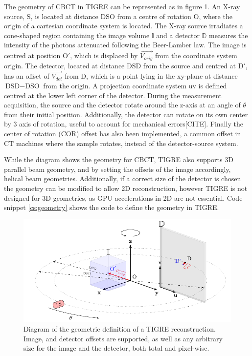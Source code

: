 The geometry of CBCT in TIGRE can be represented as in figure \ref{fig:geometryTIGRE}. An X-ray source, $\text{S}$, is located at distance $\text{DSO}$ from a centre of rotation $\text{O}$, where the origin of a cartesian coordinate system is located. The X-ray source irradiates a cone-shaped region containing the image volume $\mathbb{I}$ and a detector $\mathbb{D}$ measures the intensity of the photons attenuated following the Beer-Lamber law. The image is centred at position $\text{O}'$, which is displaced by $\overrightarrow{V_{orig}}$ from the coordinate system origin. The detector, located at distance $\text{DSD}$ from the source and centred at $\text{D}'$, has an offset of $\overrightarrow{V_{det}}$ from $\text{D}$, which is a point lying in the xy-plane at distance $\text{DSD}-\text{DSO}$ from the origin. A projection coordinate system uv is defined centred at the lower left corner of the detector. During the measurement acquisition, the source and the detector rotate around the z-axis at an angle of $\theta$ from their initial position. Additionally, the detector can rotate on its own center by 3 axis of rotation, useful to account for mechanical errors[CITE]. Finally the center of rotation (COR) offset has also been implemented, a common offset in CT machines where the sample rotates, instead of the detector-source system.

While the diagram shows the geometry for CBCT, TIGRE also supports 3D parallel beam geometry, and by setting the offsets of the image accordingly, helical beam geometries. Additionally, if a correct size of the detector is chosen the geometry can be modified to allow 2D reconstruction, however TIGRE is not designed for 3D geometries, as GPU accelerations in 2D are not essential. Code snippet \ref{cs:geometry} shows the code to define the geometry in TIGRE.

\begin{figure}
\begin{center}

\includegraphics{GPUmethods/geometrytikz-figure0.pdf} 
\end{center}

\caption[Diagram of the geometry of TIGRE]{\label{fig:geometryTIGRE} Diagram of the geometric definition of a TIGRE reconstruction. Image, and detector offsets are supported, as well as any arbitrary size for the image and the detector, both total and pixel-wise.} 
\end{figure}

